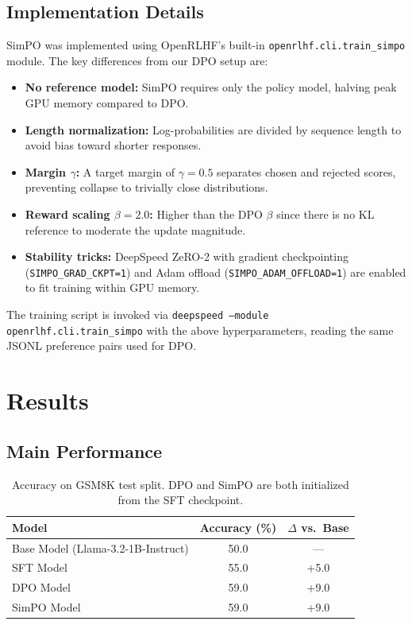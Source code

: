 \documentclass{article}
\begin{document}
\subsection{Implementation Details}

SimPO was implemented using OpenRLHF's built-in \texttt{openrlhf.cli.train\_simpo} module. The key differences from our DPO setup are:

\begin{itemize}
    \item \textbf{No reference model:} SimPO requires only the policy model, halving peak GPU memory compared to DPO.
    \item \textbf{Length normalization:} Log-probabilities are divided by sequence length to avoid bias toward shorter responses.
    \item \textbf{Margin $\gamma$:} A target margin of $\gamma = 0.5$ separates chosen and rejected scores, preventing collapse to trivially close distributions.
    \item \textbf{Reward scaling $\beta = 2.0$:} Higher than the DPO $\beta$ since there is no KL reference to moderate the update magnitude.
    \item \textbf{Stability tricks:} DeepSpeed ZeRO-2 with gradient checkpointing (\texttt{SIMPO\_GRAD\_CKPT=1}) and Adam offload (\texttt{SIMPO\_ADAM\_OFFLOAD=1}) are enabled to fit training within GPU memory.
\end{itemize}

The training script is invoked via \texttt{deepspeed --module openrlhf.cli.train\_simpo} with the above hyperparameters, reading the same JSONL preference pairs used for DPO.

\section{Results}

\subsection{Main Performance}

\begin{table}[H]
\centering
\begin{tabular}{lcc}
\toprule
\textbf{Model} & \textbf{Accuracy (\%)} & \textbf{$\Delta$ vs.\ Base} \\
\midrule
Base Model (Llama-3.2-1B-Instruct)  & 50.0 & --- \\
SFT Model & 55.0 & +5.0 \\
DPO Model & 59.0 & +9.0 \\
SimPO Model & 59.0 & +9.0 \\
\bottomrule
\end{tabular}
\caption{Accuracy on GSM8K test split. DPO and SimPO are both initialized from the SFT checkpoint.}
\end{table}
\end{document}
